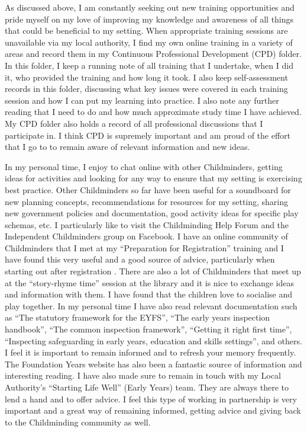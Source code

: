 \documentclass[10pt,a4paper]{report}
\begin{document}
As discussed above, I am constantly seeking out new training opportunities and pride myself on my love of improving my knowledge and awareness of all things that could be beneficial to my setting. 
When appropriate training sessions are unavailable via my local authority, I find my own online training in a variety of areas and record them in my Continuous Professional Development (CPD) folder. In this folder, I keep a running note of all training that I undertake, when I did it, who provided the training and how long it took. I also keep self-assessment records in this folder, discussing what key issues were covered in each training session and how I can put my learning into practice. I also note any further reading that I need to do and how much approximate study time I have achieved. My CPD folder also holds a record of all professional discussions that I participate in. I think CPD is supremely important and am proud of the effort that I go to to remain aware of relevant information and new ideas. 

In my personal time, I enjoy to chat online with other Childminders, getting ideas for activities and looking for any way to ensure that my setting is exercising best practice. Other Childminders so far have been useful for a soundboard for new planning concepts, recommendations for resources for my setting, sharing new government policies and documentation, good activity ideas for specific play schemas, etc. I particularly like to visit the Childminding Help Forum  and the Independent Childminders group on Facebook. I have an online community of Childminders that I met at my “Preparation for Registration” training and I have found this very useful and a good source of advice, particularly when starting out after registration . There are also a lot of Childminders that meet up at the “story-rhyme time” session at the library and it is nice to exchange ideas and information with them. I have found that the children love to socialise and play together. In my personal time I have also read relevant documentation such as “The statutory framework for the EYFS”, “The early years inspection handbook”, “The common inspection framework”, “Getting it right first time”, “Inspecting safeguarding in early years, education and skills settings”, and others. I feel it is important to remain informed and to refresh your memory frequently. The Foundation Years website has also been a fantastic source of information and interesting reading. I have also made sure to remain in touch with my Local Authority's “Starting Life Well” (Early Years) team. They are always there to lend a hand and to offer advice. I feel this type of working in partnership is very important and a great way of remaining informed, getting advice and giving back to the Childminding community as well.
\end{document}
